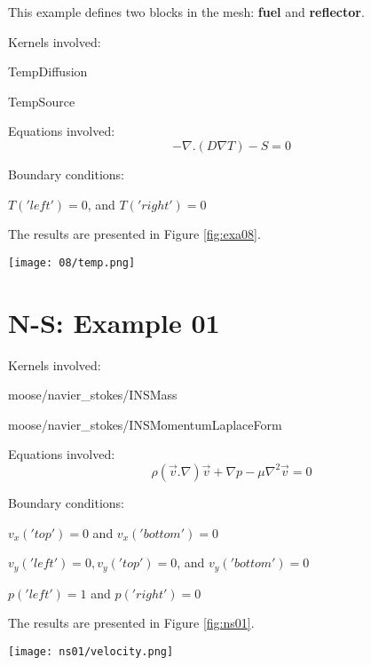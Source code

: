 \documentclass[11pt,letterpaper]{article}
\begin{document}
This example defines two blocks in the mesh: \textbf{fuel} and \textbf{reflector}.

Kernels involved:
\begin{description}[font=$\bullet$\scshape\bfseries]
	\item[] TempDiffusion
	\item[] TempSource
\end{description}

Equations involved:
\begin{equation}
-\nabla.(D\nabla T)-S=0
\end{equation}

Boundary conditions:
\begin{description}[]
	\item[] $T('left')=0$, and $T('right')=0$
\end{description}

The results are presented in Figure \ref{fig:exa08}.
\begin{figure*}[!h]
	\centering
	\texttt{[image: 08/temp.png]}
	\hfill
	\caption{Temperature.}
	\label{fig:exa08}
\end{figure*}

\section{N-S: Example 01}

Kernels involved:
\begin{description}[font=$\bullet$\scshape\bfseries]
	\item[] moose/navier\_stokes/INSMass
	\item[] moose/navier\_stokes/INSMomentumLaplaceForm
\end{description}

Equations involved:
\begin{equation}
\rho (\vec{v} . \nabla)\vec{v}+\nabla p - \mu \nabla^{2}\vec{v}=0
\end{equation}

Boundary conditions:
\begin{description}[]
	\item[] $v_{x}('top')=0$ and $v_{x}('bottom')=0$
	\item[] $v_{y}('left')=0, v_{y}('top')=0$, and $v_{y}('bottom')=0$
	\item[] $p('left')=1$ and $p('right')=0$
\end{description}

The results are presented in Figure \ref{fig:ns01}.
\begin{figure*}[!h]
	\centering
	\texttt{[image: ns01/velocity.png]} 
	\hfill
	\caption{Velocity.}
	\label{fig:ns01}
\end{figure*}
\end{document}
